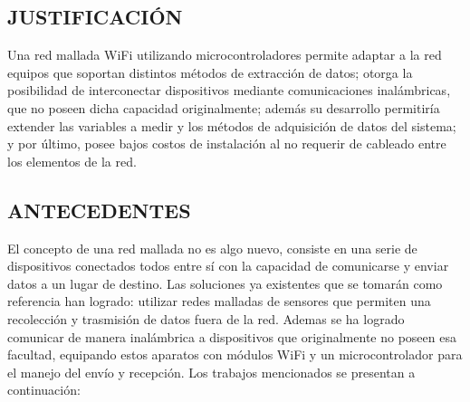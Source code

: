 \documentclass[12pt,letterpaper]{article}
\begin{document}
 \newpage


 \begin{center}
 	\section*{JUSTIFICACIÓN}
 \end{center}

\vspace{1cm}

Una red mallada WiFi utilizando microcontroladores permite adaptar a la red equipos que soportan distintos métodos de extracción de datos; otorga la posibilidad de interconectar dispositivos mediante comunicaciones inalámbricas, que no poseen dicha capacidad originalmente; además su desarrollo permitiría extender las variables a medir y los métodos de adquisición de datos del sistema; y por último, posee bajos costos de instalación al no requerir de cableado entre los elementos de la red. \\


 \newpage


 \begin{center}
 	\section*{ANTECEDENTES}
 \end{center}

\vspace{1cm}

El concepto de una red mallada no es algo nuevo, consiste en una serie de dispositivos conectados todos entre sí con la capacidad de comunicarse y enviar datos a un lugar de destino. Las soluciones ya existentes que se tomarán como referencia han logrado: utilizar redes malladas de sensores que permiten una recolección y trasmisión de datos fuera de la red. Ademas se ha logrado comunicar de manera inalámbrica a dispositivos que originalmente no poseen esa facultad, equipando estos aparatos con módulos WiFi y un microcontrolador para el manejo del envío y recepción. Los trabajos mencionados se presentan a continuación:\\
\end{document}
